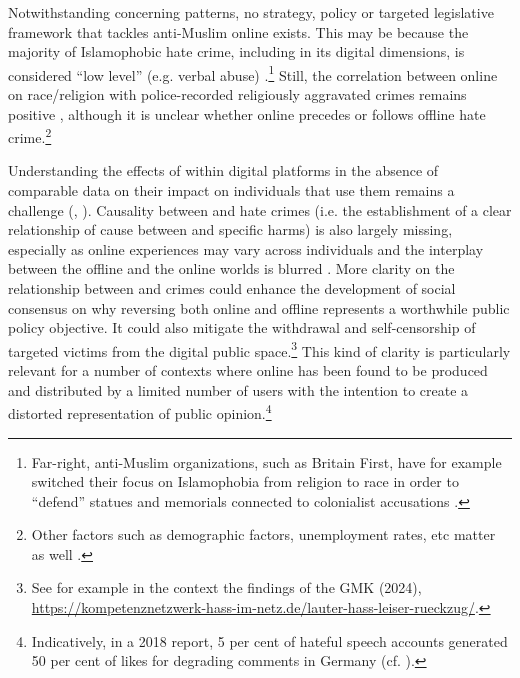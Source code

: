 \documentclass[output=paper,colorlinks,citecolor=brown]{langscibook}
\begin{document}
Notwithstanding concerning patterns, no strategy, policy or targeted legislative framework that tackles anti-Muslim online  exists. This may be because the majority of Islamophobic hate crime, including in its digital dimensions, is considered ``low level'' (e.g. verbal abuse) \citep[118]{allen2021}.\footnote{%
Far-right, anti-Muslim organizations, such as Britain First, have for example switched their focus on Islamophobia from religion to race in order to ``defend'' statues and memorials connected to colonialist accusations \citep[42]{mulhall_khan-ruf2021}. } 
Still, the correlation between online  on race/religion with police-recorded religiously aggravated crimes remains positive \citep{williams_burnap_javed_liu_ozalp2020}, although it is unclear whether online  precedes or follows offline hate crime.\footnote{%
Other factors such as demographic factors, unemployment rates, etc matter as well \citep[112]{williams_burnap_javed_liu_ozalp2020}.}

Understanding the effects of  within digital platforms in the absence of comparable data on their impact on individuals that use them remains a challenge (\citealt[17]{belfer_shorenstein2023}, \citealt[8]{vidgen_margetts_harris2019}). Causality between  and hate crimes (i.e. the establishment of a clear relationship of cause between  and specific harms) is also largely missing, especially as online experiences may vary across individuals and the interplay between the offline and the online worlds is blurred \citep[20]{belfer_shorenstein2023}. More clarity on the relationship between  and crimes could enhance the development of social consensus on why reversing  both online and offline represents a worthwhile public policy objective. It could also mitigate the withdrawal and self-censorship of targeted victims from the digital public space.\footnote{%
See for example in the  context the findings of the GMK (2024)\nocite{gmk2024}, \url{https://kompetenznetzwerk-hass-im-netz.de/lauter-hass-leiser-rueckzug/}.}
This kind of clarity is particularly relevant  for a number of contexts where  online has been found to be produced and distributed by a limited number of users with the intention to create a distorted representation of public opinion.\footnote{%
Indicatively, in a 2018 report, 5 per cent of hateful speech accounts generated 50 per cent of likes for degrading comments in Germany (cf. \citealt{kreissel_et_al2018}).}
\end{document}
